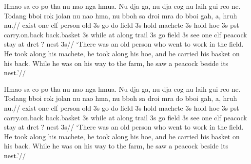 \ex[glftpos=below]
\begingl
\gla
Hmao sa co po tha  nu nao nga hmua. Nu dja ga, nu dja cog nu laih
gui reo ne. Todang bboi rok jolan nu nao hma, nu bboh sa droi mra
do bboi gah, a, hruh nu.//
\glb
exist one {clf} person old 3s go do field 3s hold machete 3s hold
hoe 3s pst carry.on.back back.basket 3s while at {along} trail 3s
go field 3s see one clf peacock stay at drct {?} nest 3s//
\glft
`There was an old person who went to work in the field. He took
along his machete, he took along his hoe, and he carried his
basket on his back. While he was on his way to the farm, he saw a
peacock beside its nest.'//
\endgl
\xe


\ex[glftpos=right]
\begingl
\gla
Hmao sa co po tha  nu nao nga hmua. Nu dja ga, nu dja cog nu laih
gui reo ne. Todang bboi rok jolan nu nao hma, nu bboh sa droi mra
do bboi gah, a, hruh nu.//
\glb
exist one {clf} person old 3s go do field 3s hold machete 3s hold
hoe 3s pst carry.on.back back.basket 3s while at {along} trail 3s
go field 3s see one clf peacock stay at drct {?} nest 3s//
\glft
`There was an old person who went to work in the field. He took
along his machete, he took along his hoe, and he carried his
basket on his back. While he was on his way to the farm, he saw a
peacock beside its nest.'//
\endgl
\xe




\endinput
\endinput

\subsection Multiple gloss lines ({\tt glstyle=multilevel})

%
%

